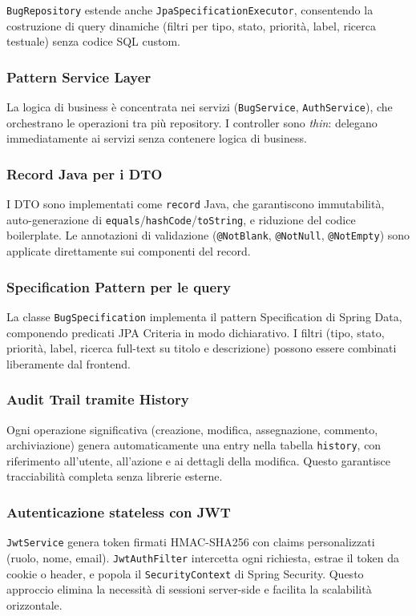 ﻿\documentclass[a4paper,11pt]{article}
\begin{document}
\texttt{BugRepository} estende anche \texttt{JpaSpecificationExecutor}, consentendo la costruzione di query dinamiche (filtri per tipo, stato, priorit\`a, label, ricerca testuale) senza codice SQL custom.

\subsubsection{Pattern Service Layer}
La logica di business \`e concentrata nei servizi (\texttt{BugService}, \texttt{AuthService}), che orchestrano le operazioni tra pi\`u repository. I controller sono \emph{thin}: delegano immediatamente ai servizi senza contenere logica di business.

\subsubsection{Record Java per i DTO}
I DTO sono implementati come \texttt{record} Java, che garantiscono immutabilit\`a, auto-generazione di \texttt{equals}/\texttt{hashCode}/\texttt{toString}, e riduzione del codice boilerplate. Le annotazioni di validazione (\texttt{@NotBlank}, \texttt{@NotNull}, \texttt{@NotEmpty}) sono applicate direttamente sui componenti del record.

\subsubsection{Specification Pattern per le query}
La classe \texttt{BugSpecification} implementa il pattern Specification di Spring Data, componendo predicati JPA Criteria in modo dichiarativo. I filtri (tipo, stato, priorit\`a, label, ricerca full-text su titolo e descrizione) possono essere combinati liberamente dal frontend.

\subsubsection{Audit Trail tramite History}
Ogni operazione significativa (creazione, modifica, assegnazione, commento, archiviazione) genera automaticamente una entry nella tabella \texttt{history}, con riferimento all'utente, all'azione e ai dettagli della modifica. Questo garantisce tracciabilit\`a completa senza librerie esterne.

\subsubsection{Autenticazione stateless con JWT}
\texttt{JwtService} genera token firmati HMAC-SHA256 con claims personalizzati (ruolo, nome, email). \texttt{JwtAuthFilter} intercetta ogni richiesta, estrae il token da cookie o header, e popola il \texttt{SecurityContext} di Spring Security. Questo approccio elimina la necessit\`a di sessioni server-side e facilita la scalabilit\`a orizzontale.
\end{document}
